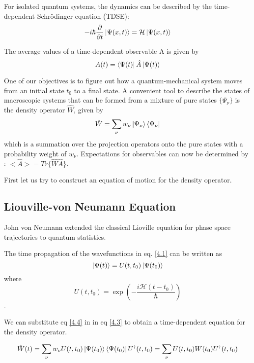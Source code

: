 For isolated quantum systems, the dynamics can be described by the time-dependent Schr{\"o}dinger equation (TDSE): \begin{equation}\label{4.1} -i\hbar \frac{\partial}{\partial t} \ket{\Psi(x, t)} = \mathcal{H} \ket{\Psi(x, t)}\end{equation}

The average values of a time-dependent observable A is given by \begin{equation} \label{4.2} A(t) = \bra{\Psi(t)} \hat{A} \ket{\Psi(t)} \end{equation}

One of our objectives is to figure out how a quantum-mechanical system moves from an initial state $t_0$ to a final state. A convenient tool to describe the states of macroscopic systems that can be formed from a mixture of pure states $\{ \Psi_{\nu} \}$ is the density operator $\hat{W}$, given by \begin{equation} \label{4.3} \hat{W} = \sum_{\nu} w_{\nu} \ket{\Psi_{\nu}} \bra{\Psi_{\nu}} \end{equation}which is a summation over the projection operators onto the pure states with a probability weight of $w_{\nu}$. Expectations for observables can now be determined by : $<\hat{A}> = Tr\{ \hat{W} \hat{A}\}$.

First let us try to construct an equation of motion for the density operator. 

\subsection{Liouville-von Neumann Equation}

John von Neumann extended the classical Lioville equation for phase space trajectories to quantum statistics.

The time propagation of the wavefunctions in eq. \ref{4.1} can be written as \begin{equation} \label{4.4} \ket{\Psi(t)} = U(t, t_0) \ket{\Psi(t_0)} \end{equation} where $$U(t, t_0) = \exp(-\frac{i \mathcal{H}(t - t_0)}{\hbar})$$.

We can substitute eq \ref{4.4} in in eq \ref{4.3} to obtain a time-dependent equation for the density operator.

\begin{equation} \label{4.5}
    \hat{W}(t) = \sum_{\nu} w_{\nu} U(t, t_0) \ket{\Psi(t_0)} \bra{\Psi(t_0)} U^{\dag}(t, t_0) = \sum_{\nu} U(t, t_0) W(t_0) U^{\dag}(t, t_0)
\end{equation}

